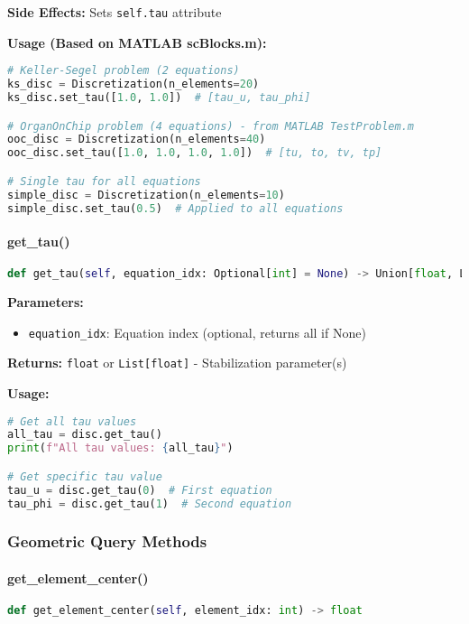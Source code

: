 \textbf{Side Effects:} Sets \texttt{self.tau} attribute

\textbf{Usage (Based on MATLAB scBlocks.m):}
\begin{lstlisting}[language=Python, caption=Tau Parameter Usage]
# Keller-Segel problem (2 equations)
ks_disc = Discretization(n_elements=20)
ks_disc.set_tau([1.0, 1.0])  # [tau_u, tau_phi]

# OrganOnChip problem (4 equations) - from MATLAB TestProblem.m
ooc_disc = Discretization(n_elements=40)
ooc_disc.set_tau([1.0, 1.0, 1.0, 1.0])  # [tu, to, tv, tp]

# Single tau for all equations
simple_disc = Discretization(n_elements=10)
simple_disc.set_tau(0.5)  # Applied to all equations
\end{lstlisting}

\paragraph{get\_tau()}
\begin{lstlisting}[language=Python, caption=Get Tau Method]
def get_tau(self, equation_idx: Optional[int] = None) -> Union[float, List[float]]
\end{lstlisting}

\textbf{Parameters:}
\begin{itemize}
    \item \texttt{equation\_idx}: Equation index (optional, returns all if None)
\end{itemize}

\textbf{Returns:} \texttt{float} or \texttt{List[float]} - Stabilization parameter(s)

\textbf{Usage:}
\begin{lstlisting}[language=Python, caption=Get Tau Usage]
# Get all tau values
all_tau = disc.get_tau()
print(f"All tau values: {all_tau}")

# Get specific tau value  
tau_u = disc.get_tau(0)  # First equation
tau_phi = disc.get_tau(1)  # Second equation
\end{lstlisting}

\subsubsection{Geometric Query Methods}

\paragraph{get\_element\_center()}
\begin{lstlisting}[language=Python, caption=Get Element Center Method]
def get_element_center(self, element_idx: int) -> float
\end{lstlisting}

